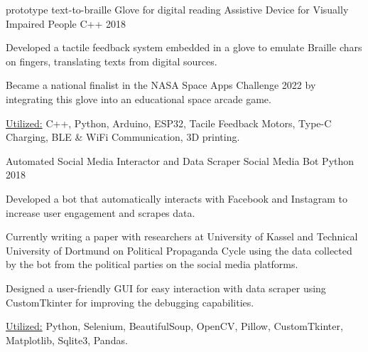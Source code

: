 \begin{cventries}
        
        \cventryprojects
        {prototype text-to-braille Glove for digital reading} %
        {Assistive Device for Visually Impaired People} %
        {C++} %
        {2018} %
        {
          \begin{cvitems} %
            \item { Developed a tactile feedback system embedded in a glove to emulate Braille chars on fingers, translating texts from digital sources.}
            \item { Became a national finalist in the NASA Space Apps Challenge 2022 by integrating this glove into an educational space arcade game.}
            \item {\underline{Utilized:} C++, Python, Arduino, ESP32, Tacile Feedback Motors, Type-C Charging, BLE \& WiFi Communication, 3D printing.}
          \end{cvitems}
          }
        \cventryprojects
        {Automated Social Media Interactor and Data Scraper} %
        {Social Media Bot} %
        {Python} %
        {2018} %
        {
          \begin{cvitems} %
            \item { Developed a bot that automatically interacts with Facebook and Instagram to increase user engagement and scrapes data.}
            \item { Currently writing a paper with researchers at University of Kassel and Technical University of Dortmund on Political Propaganda Cycle 
            using the data collected by the bot from the political parties on the social media platforms.}
            \item { Designed a user-friendly GUI for easy interaction with data scraper using CustomTkinter for improving the debugging capabilities.}
            \item {\underline{Utilized:} Python, Selenium, BeautifulSoup, OpenCV, Pillow, CustomTkinter, Matplotlib, Sqlite3, Pandas.}
          \end{cvitems}
          }
            

\end{cventries}
